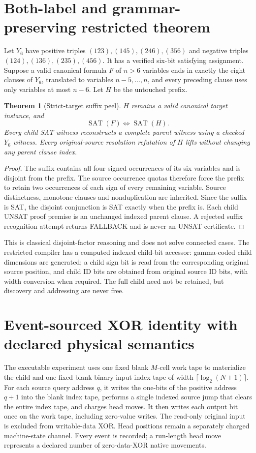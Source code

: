 \documentclass[11pt]{article}
\newtheorem{theorem}{Theorem}
\begin{document}
\section{Both-label and grammar-preserving restricted theorem}
Let $Y_6$ have positive triples $(123),(145),(246),(356)$ and negative triples $(124),(136),(235),(456)$. It has a verified six-bit satisfying assignment. Suppose a valid canonical formula $F$ of $n>6$ variables ends in exactly the eight clauses of $Y_6$, translated to variables $n-5,\ldots,n$, and every preceding clause uses only variables at most $n-6$. Let $H$ be the untouched prefix.
\begin{theorem}[Strict-target suffix peel]
$H$ remains a valid canonical target instance, and
\[
 \operatorname{SAT}(F)\iff\operatorname{SAT}(H).
\]
Every child SAT witness reconstructs a complete parent witness using a checked $Y_6$ witness. Every original-source resolution refutation of $H$ lifts without changing any parent clause index.
\end{theorem}
\begin{proof}
The suffix contains all four signed occurrences of its six variables and is disjoint from the prefix. The source occurrence quotas therefore force the prefix to retain two occurrences of each sign of every remaining variable. Source distinctness, monotone clauses and nonduplication are inherited. Since the suffix is SAT, the disjoint conjunction is SAT exactly when the prefix is. Each child UNSAT proof premise is an unchanged indexed parent clause. A rejected suffix recognition attempt returns FALLBACK and is never an UNSAT certificate.
\end{proof}
This is classical disjoint-factor reasoning and does not solve connected cases. The restricted compiler has a computed indexed child-bit accessor: gamma-coded child dimensions are generated; a child sign bit is read from the corresponding original source position, and child ID bits are obtained from original source ID bits, with width conversion when required. The full child need not be retained, but discovery and addressing are never free.

\section{Event-sourced XOR identity with declared physical semantics}
The executable experiment uses one fixed blank $M$-cell work tape to materialize the child and one fixed blank binary input-index tape of width $\lceil\log_2(N+1)\rceil$. For each source query address $q$, it writes the one-bits of the positive address $q+1$ into the blank index tape, performs a single indexed source jump that clears the entire index tape, and charges head moves. It then writes each output bit once on the work tape, including zero-value writes. The read-only original input is excluded from writable-data XOR. Head positions remain a separately charged machine-state channel. Every event is recorded; a run-length head move represents a declared number of zero-data-XOR native movements.
\end{document}
